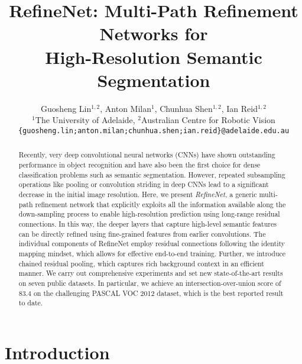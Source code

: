 \documentclass[10pt,twocolumn,letterpaper]{article}
\begin{document}
\title{RefineNet: Multi-Path Refinement Networks for\\ High-Resolution Semantic Segmentation}


\author{Guosheng Lin$^{1,2}$, \; Anton Milan$^{1}$, \; Chunhua Shen$^{1,2}$, \; Ian Reid$^{1,2}$\\
$^{1}$The University of Adelaide, \; $^{2}$Australian Centre for Robotic Vision\\
{\tt\small \{guosheng.lin;anton.milan;chunhua.shen;ian.reid\}@adelaide.edu.au}
}


\maketitle


\begin{abstract}

Recently, very deep convolutional neural networks (CNNs) have shown outstanding performance in object recognition and have also been the first choice for dense classification problems such as semantic segmentation. However, repeated subsampling operations like pooling or convolution striding in deep CNNs lead to a significant decrease in the initial image resolution.  
Here, we present \emph{RefineNet}, a generic multi-path refinement network that explicitly exploits all the information available along the down-sampling process to enable high-resolution prediction using long-range residual connections. In this way, the deeper layers that capture high-level semantic features can be directly refined using fine-grained features from earlier convolutions. The individual components of RefineNet employ residual connections following the identity mapping mindset, which allows for effective end-to-end training. Further, we introduce chained residual pooling, which captures rich background context in an efficient manner. We carry out comprehensive experiments and set new state-of-the-art results on seven public datasets. In particular, we achieve an intersection-over-union score of $83.4$ on the challenging PASCAL VOC 2012 dataset, which is the best reported result to date.


\end{abstract}


\section{Introduction}\label{sec:introduction}
\end{document}
